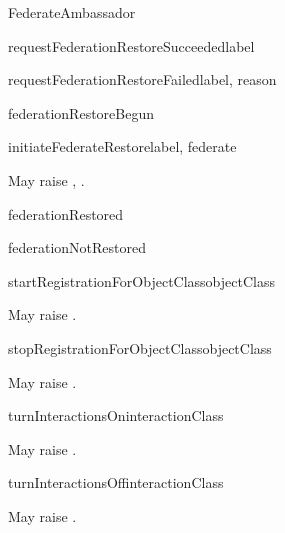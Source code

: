 \begin{classdesc}{FederateAmbassador}{}
\begin{methoddesc}{requestFederationRestoreSucceeded}{label}
\end{methoddesc}

\begin{methoddesc}{requestFederationRestoreFailed}{label, reason}
\end{methoddesc}

\begin{methoddesc}{federationRestoreBegun}{}
\end{methoddesc}

\begin{methoddesc}{initiateFederateRestore}{label, federate}

May raise
,
.
\end{methoddesc}

\begin{methoddesc}{federationRestored}{}
\end{methoddesc}

\begin{methoddesc}{federationNotRestored}{}
\end{methoddesc}

\medskip
{}

\begin{methoddesc}{startRegistrationForObjectClass}{objectClass}

May raise
.
\end{methoddesc}

\begin{methoddesc}{stopRegistrationForObjectClass}{objectClass}

May raise
.
\end{methoddesc}

\begin{methoddesc}{turnInteractionsOn}{interactionClass}

May raise
.
\end{methoddesc}

\begin{methoddesc}{turnInteractionsOff}{interactionClass}

May raise
.
\end{methoddesc}

\medskip
{}


\end{classdesc}
